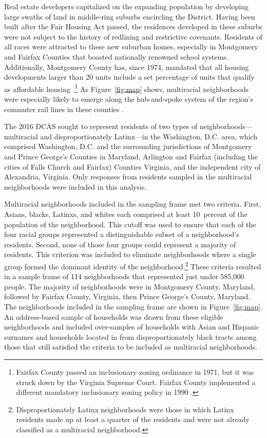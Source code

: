 \documentclass{baderart}
\begin{document}
Real estate developers capitalized on the expanding population by developing large swaths of land in middle-ring suburbs encircling the District. Having been built after the Fair Housing Act passed, the residences developed in these suburbs were not subject to the history of redlining and restrictive covenants. Residents of all races were attracted to these new suburban homes, especially in Montgomery and Fairfax Counties that boasted nationally renowned school systems. Additionally, Montgomery County has, since 1974, mandated that all housing developments larger than 20 units include a set percentage of units that qualify as affordable housing \citep{urban_institute_expanding_2012}.\footnote{Fairfax County passed an inclusionary   zoning ordinance in 1971, but it was struck down by the Virginia   Supreme Court. Fairfax County implemented a different mandatory   inclusionary zoning policy in 1990 \citep{silverstein_welcome_2017}.} As Figure~\ref{fig:map} shows, multiracial neighborhoods were especially likely to emerge along the hub-and-spoke system of the region's commuter rail lines in these counties \citep[see also, ][]{holloway_racially_2012}.


The 2016 DCAS sought to represent residents of two types of neighborhoods---multiracial and disproportionately Latinx---in the Washington, D.C. area, which comprised Washington, D.C. and the surrounding jurisdictions of Montgomery and Prince George's Counties in Maryland, Arlington and Fairfax (including the cities of Falls Church and Fairfax) Counties Virginia, and the independent city of Alexandria, Virginia. Only responses from residents sampled in the multiracial neighborhoods were included in this analysis.

Multiracial neighborhoods included in the sampling frame met two criteria. First, Asians, blacks, Latinxs, and whites each comprised at least 10~percent of the population of the neighborhood. This cutoff was used to ensure that each of the four racial groups represented a distinguishable subset of a neighborhood's residents. Second, none of those four groups could represent a majority of residents. This criterion was included to eliminate neighborhoods where a single group formed the dominant identity of the neighborhood.\footnote{Disproportionately   Latinx neighborhoods were those in which Latinx residents made up at   least a quarter of the residents and were not already classified as a   multiracial neighborhood.} These criteria resulted in a sample frame of 114 neighborhoods that represented just under 585,000 people. The majority of neighborhoods were in Montgomery County, Maryland, followed by Fairfax County, Virginia, then Prince George's County, Maryland. The neighborhoods included in the sampling frame are shown in Figure~\ref{fig:map}. An address-based sample of households was drawn from these eligible neighborhoods and included over-samples of households with Asian and Hispanic surnames and households located in from disproportionately black tracts among those that still satisfied the criteria to be included as multiracial neighborhoods.
\end{document}
